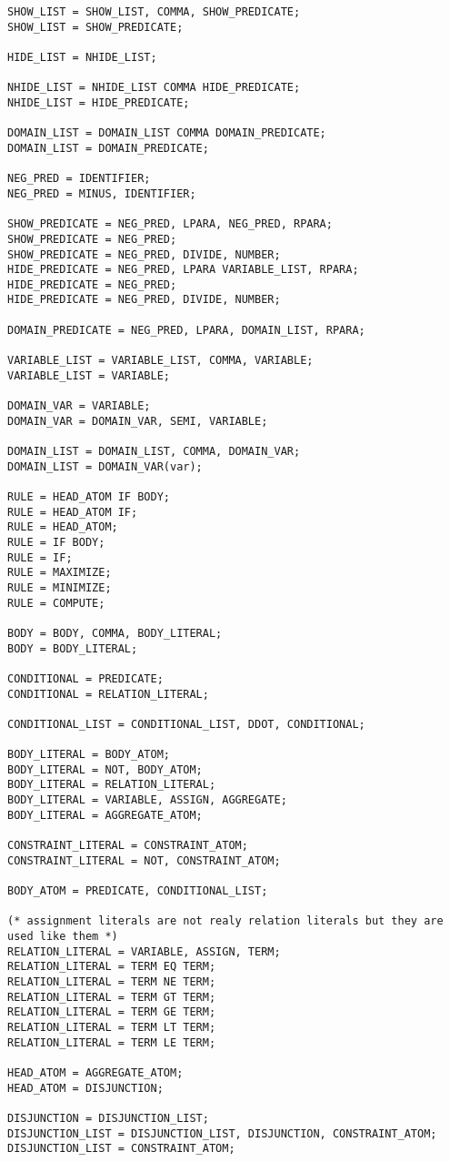 \begin{verbatim}
SHOW_LIST = SHOW_LIST, COMMA, SHOW_PREDICATE;
SHOW_LIST = SHOW_PREDICATE;

HIDE_LIST = NHIDE_LIST;

NHIDE_LIST = NHIDE_LIST COMMA HIDE_PREDICATE;
NHIDE_LIST = HIDE_PREDICATE;

DOMAIN_LIST = DOMAIN_LIST COMMA DOMAIN_PREDICATE;
DOMAIN_LIST = DOMAIN_PREDICATE;

NEG_PRED = IDENTIFIER;
NEG_PRED = MINUS, IDENTIFIER;

SHOW_PREDICATE = NEG_PRED, LPARA, NEG_PRED, RPARA;
SHOW_PREDICATE = NEG_PRED;
SHOW_PREDICATE = NEG_PRED, DIVIDE, NUMBER;
HIDE_PREDICATE = NEG_PRED, LPARA VARIABLE_LIST, RPARA;
HIDE_PREDICATE = NEG_PRED;
HIDE_PREDICATE = NEG_PRED, DIVIDE, NUMBER;

DOMAIN_PREDICATE = NEG_PRED, LPARA, DOMAIN_LIST, RPARA;

VARIABLE_LIST = VARIABLE_LIST, COMMA, VARIABLE;
VARIABLE_LIST = VARIABLE;

DOMAIN_VAR = VARIABLE;
DOMAIN_VAR = DOMAIN_VAR, SEMI, VARIABLE;

DOMAIN_LIST = DOMAIN_LIST, COMMA, DOMAIN_VAR;
DOMAIN_LIST = DOMAIN_VAR(var);

RULE = HEAD_ATOM IF BODY;
RULE = HEAD_ATOM IF;
RULE = HEAD_ATOM;
RULE = IF BODY;
RULE = IF;
RULE = MAXIMIZE;
RULE = MINIMIZE;
RULE = COMPUTE;

BODY = BODY, COMMA, BODY_LITERAL;
BODY = BODY_LITERAL;

CONDITIONAL = PREDICATE;
CONDITIONAL = RELATION_LITERAL;

CONDITIONAL_LIST = CONDITIONAL_LIST, DDOT, CONDITIONAL;

BODY_LITERAL = BODY_ATOM;
BODY_LITERAL = NOT, BODY_ATOM;
BODY_LITERAL = RELATION_LITERAL;
BODY_LITERAL = VARIABLE, ASSIGN, AGGREGATE;
BODY_LITERAL = AGGREGATE_ATOM;

CONSTRAINT_LITERAL = CONSTRAINT_ATOM;
CONSTRAINT_LITERAL = NOT, CONSTRAINT_ATOM;

BODY_ATOM = PREDICATE, CONDITIONAL_LIST;

(* assignment literals are not realy relation literals but they are used like them *)
RELATION_LITERAL = VARIABLE, ASSIGN, TERM;
RELATION_LITERAL = TERM EQ TERM;
RELATION_LITERAL = TERM NE TERM;
RELATION_LITERAL = TERM GT TERM;
RELATION_LITERAL = TERM GE TERM;
RELATION_LITERAL = TERM LT TERM;
RELATION_LITERAL = TERM LE TERM;

HEAD_ATOM = AGGREGATE_ATOM;
HEAD_ATOM = DISJUNCTION;

DISJUNCTION = DISJUNCTION_LIST;
DISJUNCTION_LIST = DISJUNCTION_LIST, DISJUNCTION, CONSTRAINT_ATOM;
DISJUNCTION_LIST = CONSTRAINT_ATOM;


\end{verbatim}
